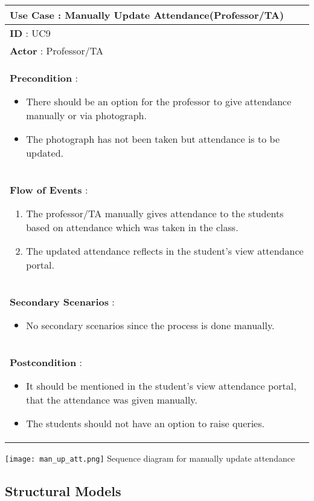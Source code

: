 \documentclass[paper=a4, fontsize=15pt]{scrartcl}
\begin{document}
\begin{tabular}{|p{36em}|} 
 \hline
 \textbf{Use Case :  Manually Update Attendance(Professor/TA)}\\
 \hline
 \textbf{ID } : UC9\\
 \hline
 \textbf{Actor }: Professor/TA\\
 \hline
 \textbf{Precondition }:
 \begin{itemize}[topsep=0pt]
     \item There should be an option for the professor to give attendance manually or via photograph.
     \item The photograph has not been taken but attendance is to be updated.
 \end{itemize}\\
 \hline
 \textbf{Flow of Events }:
 \begin{enumerate}[topsep=0pt]
     \item The professor/TA manually gives attendance to the students based on attendance which was taken in the class.
     \item The updated attendance reflects in the student's view attendance portal.          
 \end{enumerate}\\
 \hline
 \textbf{Secondary Scenarios }:
\begin{itemize}[topsep=0pt]
    \item No secondary scenarios since the process is done manually.
\end{itemize}\\
 \hline 
 \textbf{Postcondition }:
 \begin{itemize}[topsep=0pt]
     \item It should be mentioned in the student's view attendance portal, that the attendance was given manually.
     \item The students should not have an option to raise queries.
 \end{itemize}\\
 \hline
 
 
 \end{tabular}

 \begin{center}
\texttt{[image: man\_up\_att.png]}
 {\Large Sequence diagram for manually update attendance}
\end{center}

\pagebreak

\subsection{Structural Models}
\end{document}
